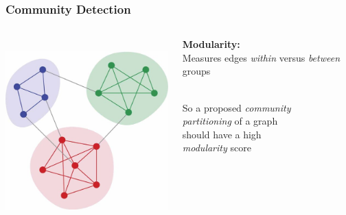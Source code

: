 \documentclass[xcolor={dvipsnames}]{beamer}
\begin{document}
\frame
{
\frametitle{Community Detection}

\begin{columns}
\begin{column}{.3\textwidth}

${}$\\

\vspace{-.75em}
\includegraphics[width=2.75in]{stuff/communities.jpg}

\end{column}
\begin{column}{.75\textwidth}

\textbf{Modularity:} \\Measures edges \emph{within} versus \emph{between} groups\\
${}$

\hspace{1.5in}So a  proposed \emph{community}\\ 
\hspace{1.5in}\emph{partitioning} of a graph\\
\hspace{1.5in}should have a high\\
\hspace{1.5in}\emph{modularity} score \\${}$\\${}$\\

\vspace{-.5em}




\end{column}
\end{columns}

}
\end{document}
